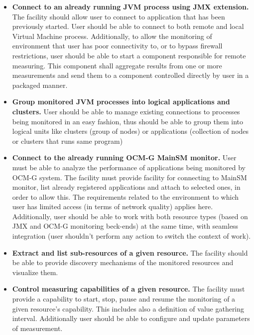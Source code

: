 \begin{itemize}

\item {\bf Connect to an already running JVM process using JMX extension.} 
The facility should allow user to connect to application that has been previously started. User should be able to connect to both remote and local Virtual Machine process. Additionally, to allow the monitoring of environment that user has poor connectivity to, or to bypass firewall restrictions, user should be able to start a component responsible for remote measuring. This component shall aggregate results from one or more measurements and send them to a component controlled directly by user in a packaged manner.

\item {\bf Group monitored JVM processes into logical applications and clusters.}
User should be able to manage existing connections to processes being monitored in an easy fashion, thus should be able to group them into logical units like clusters (group of nodes) or applications (collection of nodes or clusters that runs same program)

\item {\bf Connect to the already running OCM-G MainSM monitor.}
User must be able to analyze the performance of applications being monitored by OCM-G system. The facility must provide facility for connecting to MainSM monitor, list already registered applications and attach to selected ones, in order to allow this. The requirements related to the environment to which user has limited access (in terms of network quality) applies here. Additionally, user should be able to work with both resource types (based on JMX and OCM-G monitoring beck-ends) at the same time, with seamless integration (user shouldn't perform any action to switch the context of work).

\item {\bf Extract and list sub-resources of a given resource.}
The facility should be able to provide discovery mechanisms of the monitored resources and visualize them.

\item {\bf Control measuring capabilities of a given resource.}
The facility must provide a capability to start, stop, pause and resume the monitoring of a given resource's capability. This includes also a definition of value gathering interval. Additionally user should be able to configure and update parameters of measurement. 


\end{itemize}
